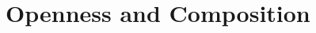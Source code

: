\documentclass[letterpaper,11pt]{article}
\newcommand{\dg}[1]{{\textcolor{blue}{#1}}}
\begin{document}



\section{Openness and Composition}\label{sec:OC}
\end{document}
